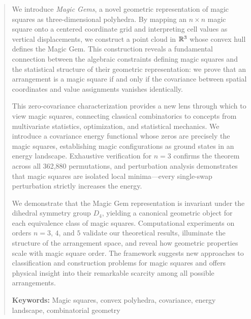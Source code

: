 \begin{abstract}
We introduce \emph{Magic Gems}, a novel geometric representation of magic squares as three-dimensional polyhedra. 
By mapping an $n \times n$ magic square onto a centered coordinate grid and interpreting cell values as vertical displacements, 
we construct a point cloud in $\R^3$ whose convex hull defines the Magic Gem.
This construction reveals a fundamental connection between the algebraic constraints defining magic squares 
and the statistical structure of their geometric representation: 
we prove that an arrangement is a magic square if and only if the covariance between spatial coordinates 
and value assignments vanishes identically.

This zero-covariance characterization provides a new lens through which to view magic squares, 
connecting classical combinatorics to concepts from multivariate statistics, optimization, and statistical mechanics.
We introduce a covariance energy functional whose zeros are precisely the magic squares,
establishing magic configurations as ground states in an energy landscape.
Exhaustive verification for $n = 3$ confirms the theorem across all 362,880 permutations,
and perturbation analysis demonstrates that magic squares are isolated local minima---every 
single-swap perturbation strictly increases the energy.

We demonstrate that the Magic Gem representation is invariant under the dihedral symmetry group $D_4$, 
yielding a canonical geometric object for each equivalence class of magic squares.
Computational experiments on orders $n = 3$, $4$, and $5$ validate our theoretical results,
illuminate the structure of the arrangement space,
and reveal how geometric properties scale with magic square order.
The framework suggests new approaches to classification and construction problems for magic squares 
and offers physical insight into their remarkable scarcity among all possible arrangements.

\medskip
\noindent\textbf{Keywords:} Magic squares, convex polyhedra, covariance, energy landscape, combinatorial geometry
\end{abstract}
